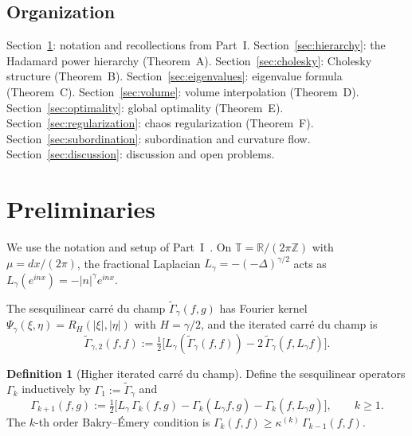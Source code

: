 \documentclass[11pt,a4paper]{article}
\theoremstyle{plain}
\theoremstyle{definition}
\newtheorem{definition}[theorem]{Definition}
\theoremstyle{remark}
\newcommand{\R}{\mathbb{R}}
\newcommand{\Z}{\mathbb{Z}}
\newcommand{\T}{\mathbb{T}}
\begin{document}
\subsection{Organization}

Section~\ref{sec:prelim}: notation and recollections from Part~I.
Section~\ref{sec:hierarchy}: the Hadamard power hierarchy
  (Theorem~A).
Section~\ref{sec:cholesky}: Cholesky structure (Theorem~B).
Section~\ref{sec:eigenvalues}: eigenvalue formula (Theorem~C).
Section~\ref{sec:volume}: volume interpolation (Theorem~D).
Section~\ref{sec:optimality}: global optimality (Theorem~E).
Section~\ref{sec:regularization}: chaos regularization (Theorem~F).
Section~\ref{sec:subordination}: subordination and curvature flow.
Section~\ref{sec:discussion}: discussion and open problems.


\section{Preliminaries}\label{sec:prelim}

We use the notation and setup of Part~I~\cite{Fontes2026b}.
On $\T = \R/(2\pi\Z)$ with $\mu = dx/(2\pi)$, the fractional
Laplacian $L_\gamma = -(-\Delta)^{\gamma/2}$ acts as
$L_\gamma(e^{inx}) = -|n|^\gamma e^{inx}$.

The sesquilinear carr\'e du champ
$\widetilde{\Gamma}_\gamma(f,g)$ has Fourier kernel
$\Psi_\gamma(\xi,\eta) = R_H(|\xi|,|\eta|)$ with $H = \gamma/2$,
and the iterated carr\'e du champ is
\begin{equation}\label{eq:gamma2-def}
  \widetilde{\Gamma}_{\gamma,2}(f,f)
  := \tfrac{1}{2}\bigl[
    L_\gamma(\widetilde{\Gamma}_\gamma(f,f))
    - 2\,\widetilde{\Gamma}_\gamma(f, L_\gamma f)
  \bigr].
\end{equation}

\begin{definition}[Higher iterated carr\'e du champ]
\label{def:higher-gamma}
Define the sesquilinear operators $\Gamma_k$ inductively by
$\Gamma_1 := \widetilde{\Gamma}_\gamma$ and
\begin{equation}\label{eq:Gammak-def}
  \Gamma_{k+1}(f,g)
  := \tfrac{1}{2}\bigl[
    L_\gamma\,\Gamma_k(f,g)
    - \Gamma_k(L_\gamma f, g)
    - \Gamma_k(f, L_\gamma g)
  \bigr],
  \qquad k \geq 1.
\end{equation}
The $k$-th order Bakry--\'Emery condition is
$\Gamma_k(f,f) \geq \kappa^{(k)}\,\Gamma_{k-1}(f,f)$.
\end{definition}
\end{document}
